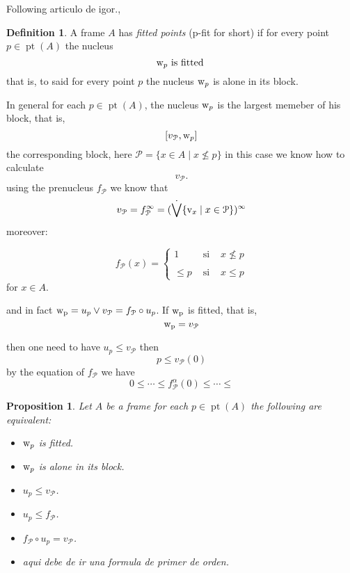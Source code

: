 \documentclass[11pt]{amsart}
\DeclareMathOperator{\pt}{pt}
\theoremstyle{plain}
\newtheorem{prop}[thm]{Proposition}
\theoremstyle{definition}
\newtheorem{dfn}[thm]{Definition}
\begin{document}
Following articulo de igor.,

\begin{dfn}\label{pfit}
A frame $A$ has \emph{fitted points} ({\rm p-fit} for short) if for every point $p\in\pt(A)$ the nucleus \[{\rm w}_{p} \text{ is fitted }\]
that is, to said for every point $p$ the nucleus ${\rm w}_{p}$ is alone in its block.
\end{dfn}



In general for each $p\in\pt(A)$, the nucleus ${\rm w}_{p}$ is the largest memeber of his block, that is,
\[[v_{\mathcal{P}},{\rm w}_{p}]\] the corresponding block, here $\mathcal{P}=\{x\in A\mid x\nleq p\}$ 
in this case we know how to calculate \[v_{\mathcal{P}}.\] using the prenucleus $f_{\mathcal{P}}$
we know that \[v_{\mathcal{P}}=f_{\mathcal{P}}^{\infty}=(\dot{\bigvee}\{{\rm v}_{x}\mid x\in\mathcal{P}\})^{\infty}\]
moreover:

\[
f_{\mathcal{P}}(x)=\left\{
	\begin{array}{lcc}
1 & \mbox{ si } & x\nleq p\\
\\
\leq p & \mbox{ si } & x\leq p
\end{array}\right.
\]
for $x\in A$.


and in fact ${\rm w_{p}}=u_{p}\vee v_{\mathcal{P}}=f_{\mathcal{P}}\circ u_{p}$. If ${\rm w_{p}}$ is fitted, that is, \[{\rm w_{p}}=v_{\mathcal{P}}\]

then one need to have $u_{p}\leq v_{\mathcal{P}}$ then \[p\leq v_{\mathcal{P}}(0)\] by the equation of $f_{\mathcal{P}}$ we have \[0\leq\cdots\leq f_{\mathcal{P}}^{\alpha}(0)\leq\cdots\leq\]


\begin{prop}\label{pfitequiv}
Let $A$ be a frame for each $p\in\pt(A)$ the following are equivalent:
 \begin{itemize}
\item[(i)] ${\rm w}_{p}$ is fitted.
\item[(ii)] ${\rm w}_{p}$ is alone in its block.
\item[(iii)] $u_{p}\leq v_{\mathcal{P}}$.
\item[(iv)] $u_{p}\leq f_{\mathcal{P}}$.
\item[(v)] $f_{\mathcal{P}}\circ u_{p}=v_{\mathcal{P}}$.
\item[(vi)] aqui debe de ir una formula de primer de orden.
 \end{itemize}
\end{prop}	
\end{document}
